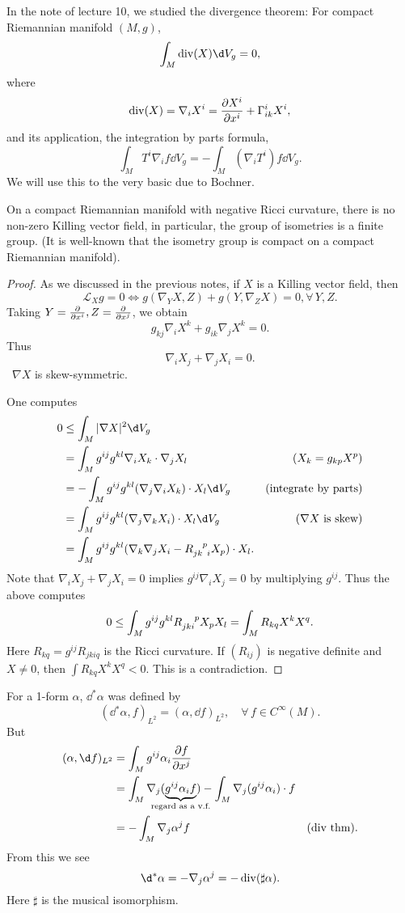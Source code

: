 \documentclass[12pt]{article}
\begin{document}
In the note of lecture 10, we studied the divergence theorem:
For compact Riemannian manifold \((M,g)\), \[
  \int_{M}\op{div}(X)\dd{V_g}=0
,\] where \[
  \operatorname{div}(X)=\nabla_i X^i=\pdv{X^i}{x^i}+\Gamma_{ik}^i X^i
,\] and its application, the integration by parts formula, \[
  \int_{M}T^i \nabla_i f\dd{V_g}=-\int_{M}(\nabla_i T^i)f\dd{V_g}
.\] We will use this to the very basic due to Bochner.
\begin{theorem}
  On a compact Riemannian manifold with negative Ricci curvature, there is no
  non-zero Killing vector field, in particular, the group of isometries is
  a finite group. (It is well-known that the isometry group is compact on a 
  compact Riemannian manifold).
\end{theorem}
\begin{proof}
  As we discussed in the previous notes, if \(X\) is a Killing vector field,
  then \[
    \mathcal{L}_X g=0\iff g(\nabla_Y X,Z)+g(Y,\nabla_Z X)=0,\forall\,Y,Z
  .\] Taking \(Y=\pdv{}{x^i},Z=\pdv{}{x^j}\), we obtain \[
    g_{kj}\nabla_i X^k+g_{ik}\nabla_j X^k=0
  .\] Thus \[
    \nabla_i X_j+\nabla_j X_i=0
  .\] \ie\ \(\nabla X\) is skew-symmetric.

  One computes
  \begin{align*}
    0&\le \int_{M}|\nabla X|^2\dd{V_g} \\
    &=\int_{M}g^{ij}g^{kl}\nabla_i X_k\cdot \nabla_j X_l
    &(X_k=g_{kp}X^p) \\
    &=-\int_{M}g^{ij}g^{kl}(\nabla_j \nabla_i X_k)\cdot X_l \dd{V_g}
    &(\text{integrate by parts}) \\
    &=\int_{M}g^{ij}g^{kl}(\nabla_j \nabla_k X_i)\cdot X_l \dd{V_g}
    &(\nabla X\text{ is skew}) \\
    &=\int_{M}g^{ij}g^{kl}(\nabla_k \nabla_j X_i-R\indices{_{jk}^p_i}X_p)
    \cdot X_l
  .\end{align*} Note that \(\nabla_i X_j+\nabla_j X_i=0\) implies \(g^{ij}
  \nabla_i X_j=0\) by multiplying \(g^{ij}\). Thus the above computes \[
    0\le\int_{M}g^{ij}g^{kl}R\indices{_{jki}^p}X_p X_l
    =\int_{M}R_{kq}X^k X^q
  .\] Here \(R_{kq}=g^{ij}R_{jkiq}\) is the Ricci curvature. If \((R_{ij})\) is
  negative definite and \(X\neq 0\), then \(\int R_{kq}X^k X^q<0\). This is
  a contradiction.
\end{proof}

For a 1-form \(\alpha\), \(\dd^*\alpha\) was defined by \[
  (\dd{}^*\alpha,f)_{L^2}=(\alpha,\dd{f})_{L^2},\quad\forall\,f\in C^\infty(M)
.\] But
\begin{align*}
  (\alpha,\dd{f})_{L^2}&=\int_{M}g^{ij}\alpha_i \pdv{f}{x^j} \\
  &=\int_{M}\nabla_j (\underbrace{g^{ij}\alpha_i f}_{\mathclap{
  \text{regard as a v.f.}}})-\int_{M}\nabla_j (g^{ij}\alpha_i)\cdot f \\
  &=-\int_{M}\nabla_j \alpha^j f &(\text{div thm})
.\end{align*} 
From this we see \[
  \dd{}^*\alpha=-\nabla_j \alpha^j=-\op{div}(\sharp \alpha)
.\] Here \(\sharp\) is the musical isomorphism.
\end{document}
